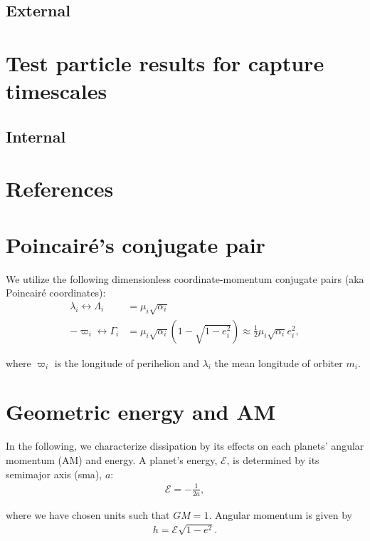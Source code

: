 \documentclass[11pt]{article}
\begin{document}
\subsection{External}
\label{sec:orga3e8b1c}
\section{Test particle results for capture timescales}
\label{sec:org55a3318}

\subsection{Internal}
\label{sec:orgf9a02e2}

\section{References}
\label{sec:orgdd419b5}



\clearpage
\onecolumn
\appendix

\section{Poincair\'e's conjugate pair}
\label{sec:orgabbf997}
We utilize the following dimensionless coordinate-momentum conjugate
pairs (aka Poincair\'e coordinates):
\begin{align}
  \lambda_i \longleftrightarrow\Lambda_i &= \mu_i\sqrt{\alpha_i} \\
  -\varpi_i \longleftrightarrow\Gamma_i &= \mu_i\sqrt{\alpha_i}(1-\sqrt{1-e_i^2}) \approx \frac12\mu_i\sqrt{\alpha_i}e_i^2,
\end{align}

\noindent
where \(\varpi_i\) is the longitude of perihelion and \(\lambda_i\) the mean longitude
of orbiter \(m_i\).

\section{Geometric energy and AM}
\label{sec:org386b699}
In the following, we characterize dissipation by its effects on each
planets' angular momentum (AM) and energy.  A planet's energy,
\(\mathcal E\), is determined by its semimajor axis (sma), \(a\):
\begin{align}
   \mathcal E = -\frac{1}{2a},
\end{align}
\noindent

\noindent
where we have chosen units such that \(GM=1\).
Angular momentum is given by
\begin{align}
h = \mathcal E \sqrt{1-e^2}.
\end{align}
\end{document}
